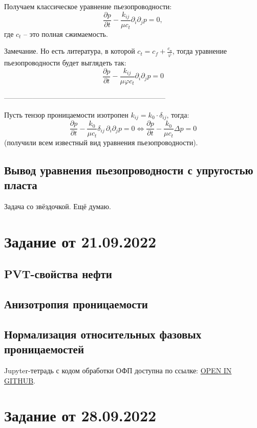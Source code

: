 \documentclass[a4paper,12pt]{article}
\newcommand{\beq}{\begin{equation}}
\newcommand{\eeq}{\end{equation}}
\begin{document}
Получаем классическое уравнение пьезопроводности:
\beq
\frac{\partial p}{\partial t}-\frac{k_{ij}}{\mu c_t}\partial_i\partial_j p=0,
\eeq
где $c_t$ -- это полная сжимаемость.

Замечание. Но есть литература, в которой $c_t=c_f+\frac{c_\text{п}}{\varphi}$, тогда уравнение пьезопроводности будет выглядеть так:
\beq
\frac{\partial p}{\partial t}-\frac{k_{ij}}{\mu\varphi c_t}\partial_i\partial_j p=0
\eeq

--------------------------------------------------------------------

Пусть тензор проницаемости изотропен $k_{ij}=k_0\cdot\delta_{ij}$, тогда:
\beq
\frac{\partial p}{\partial t}-\frac{k_0}{\mu c_t}\delta_{ij}\,\partial_i\partial_j p=0\Leftrightarrow\frac{\partial p}{\partial t}-\frac{k_0}{\mu c_t}\Delta p=0
\eeq
(получили всем известный вид уравнения пьезопроводности).


\subsection{Вывод уравнения пьезопроводности с упругостью пласта}

Задача со звёздочкой. Ещё думаю.

\section{Задание от 21.09.2022}

\subsection{PVT-свойства нефти}

\subsection{Анизотропия проницаемости}

\subsection{Нормализация относительных фазовых проницаемостей}
Jupyter-тетрадь с кодом обработки ОФП доступна по ссылке: \href{https://github.com/mualal/notebooks-source/blob/master/9_labdata_relative_permeabilities.ipynb}{OPEN IN GITHUB}.


\newpage
\section{Задание от 28.09.2022}
\end{document}
